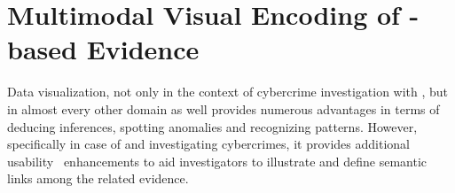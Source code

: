 
\section{Multimodal Visual Encoding of {\flucid}-based Evidence}
\label{sect:3d-viz}

Data visualization, not only in the context of cybercrime investigation with 
{\flucid}, but in almost every other domain as well provides numerous 
advantages in terms of deducing inferences, spotting anomalies and 
recognizing patterns.  However, specifically in case of {\flucid} and 
investigating cybercrimes, it provides additional usability~\cite{interaction-design-3ed} enhancements to 
aid investigators to illustrate and define semantic links among the related 
evidence.


